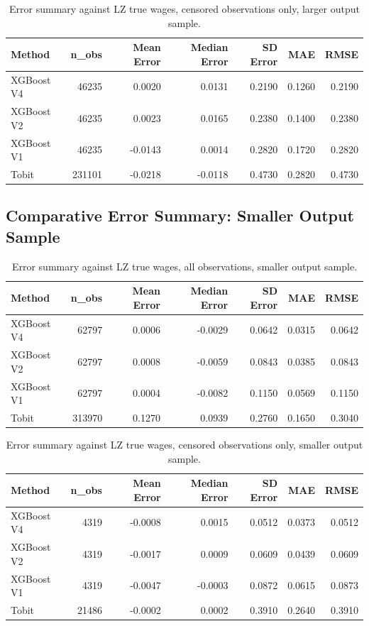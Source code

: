 \documentclass{article}
\begin{document}
\begin{table}[H]
\centering
\begin{tabular}{lrrrrrr}
\toprule
Method & n\_obs & Mean Error & Median Error & SD Error & MAE & RMSE \\
\midrule
XGBoost V4 & 46235 & 0.0020 & 0.0131 & 0.2190 & 0.1260 & 0.2190 \\
XGBoost V2 & 46235 & 0.0023 & 0.0165 & 0.2380 & 0.1400 & 0.2380 \\
XGBoost V1 & 46235 & -0.0143 & 0.0014 & 0.2820 & 0.1720 & 0.2820 \\
Tobit      & 231101 & -0.0218 & -0.0118 & 0.4730 & 0.2820 & 0.4730 \\
\bottomrule
\end{tabular}
\caption{Error summary against LZ true wages, censored observations only, larger output sample.}
\label{tab:error_summary_large_censored}
\end{table}

\subsection{Comparative Error Summary: Smaller Output Sample}

\begin{table}[H]
\centering
\begin{tabular}{lrrrrrr}
\toprule
Method & n\_obs & Mean Error & Median Error & SD Error & MAE & RMSE \\
\midrule
XGBoost V4 & 62797 & 0.0006 & -0.0029 & 0.0642 & 0.0315 & 0.0642 \\
XGBoost V2 & 62797 & 0.0008 & -0.0059 & 0.0843 & 0.0385 & 0.0843 \\
XGBoost V1 & 62797 & 0.0004 & -0.0082 & 0.1150 & 0.0569 & 0.1150 \\
Tobit      & 313970 & 0.1270 & 0.0939 & 0.2760 & 0.1650 & 0.3040 \\
\bottomrule
\end{tabular}
\caption{Error summary against LZ true wages, all observations, smaller output sample.}
\label{tab:error_summary_small_all}
\end{table}

\begin{table}[H]
\centering
\begin{tabular}{lrrrrrr}
\toprule
Method & n\_obs & Mean Error & Median Error & SD Error & MAE & RMSE \\
\midrule
XGBoost V4 & 4319 & -0.0008 & 0.0015 & 0.0512 & 0.0373 & 0.0512 \\
XGBoost V2 & 4319 & -0.0017 & 0.0009 & 0.0609 & 0.0439 & 0.0609 \\
XGBoost V1 & 4319 & -0.0047 & -0.0003 & 0.0872 & 0.0615 & 0.0873 \\
Tobit      & 21486 & -0.0002 & 0.0002 & 0.3910 & 0.2640 & 0.3910 \\
\bottomrule
\end{tabular}
\caption{Error summary against LZ true wages, censored observations only, smaller output sample.}
\label{tab:error_summary_small_censored}
\end{table}
\end{document}
